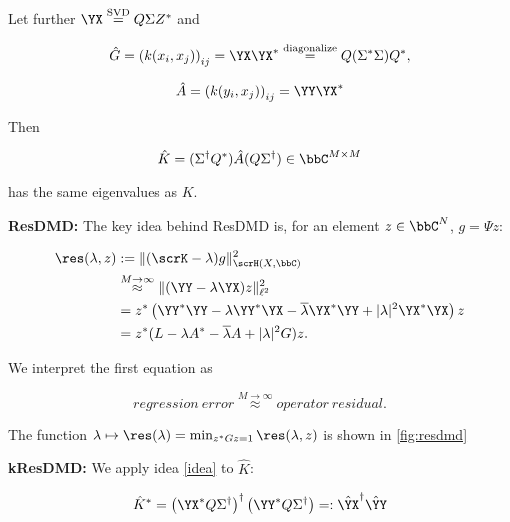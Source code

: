 Let further $\YX \stackrel{\text{SVD}}{=} Q \Sigma Z^*$ and

\begin{equation}
    \hat{G} = \left( k(x_i, x_j) \right)_{i j} = 
    \YX \YX^* 
    \stackrel{\text{diagonalize}}{=} Q (\Sigma^* \Sigma) Q^*, 
\end{equation}

\begin{equation}
    \hat{A} = \left( k(y_i, x_j) \right)_{i j} = 
    \YY \YX^*
\end{equation}

Then 

\begin{equation}
    \hat{K} = ( \Sigma^\dagger Q^* ) \hat{A} ( Q \Sigma^\dagger ) \in \bbC^{M \times M}
\end{equation}

has the same eigenvalues as $K$. 

\textbf{ResDMD:} The key idea behind ResDMD is, for an element $z \in \bbC^N$, 
$g = \Psi z$: 

\begin{align}
    \res (\lambda, z) &:= 
    \| (\scrK - \lambda) g \|_{\scrH (X, \bbC)}^2 \\
    &\stackrel{M \to \infty}{\approx} \| (\YY - \lambda \YX) z \|_{\ell^2}^2 \\
    &= z^* \left( \YY^* \YY - \lambda \YY^* \YX - \overline{\lambda} \YX^* \YY + 
    | \lambda |^2 \YX^* \YX \right) z \\
    &= z^* (L - \lambda A^* - \overline{\lambda} A + | \lambda |^2 G) z . 
\end{align}

We interpret the first equation as 

\begin{equation}
    \label{idea}
    regression\ error \stackrel{M \to \infty}{\approx} operator\ residual .
\end{equation}

The function $\lambda \mapsto \res (\lambda) = \min_{z^* G z = 1} \res (\lambda, z)$ is shown in 
\ref{fig:resdmd}

\iffalse
\textbf{kResDMD:} We apply idea \ref{idea} to $\hat{K}$: 

\begin{equation}
    \hat{K}^* = \left( \YX^* Q \Sigma^\dagger \right)^\dagger 
    \left( \YY^* Q \Sigma^\dagger \right) =:
    \hat{\YX}^\dagger \hat{\YY}
\end{equation}

